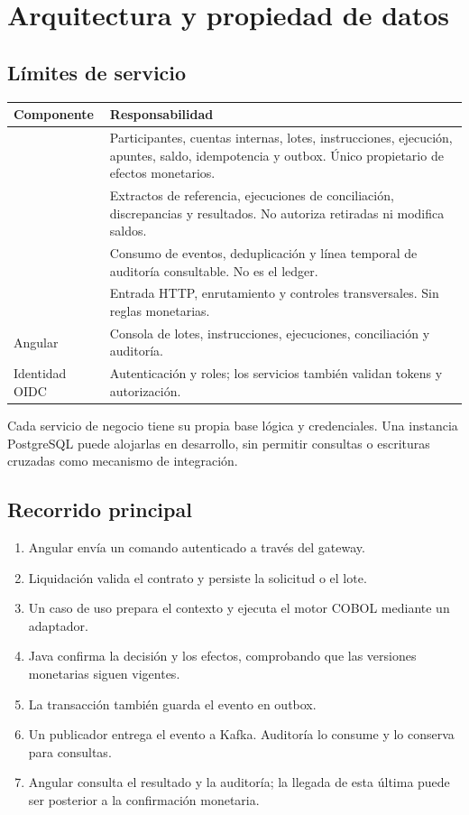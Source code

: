 \chapter{Arquitectura y propiedad de datos}
\section{Límites de servicio}
\begin{longtable}{L{0.30\textwidth}L{0.62\textwidth}}
\textbf{Componente} & \textbf{Responsabilidad}\\\hline
{} & Participantes, cuentas internas, lotes, instrucciones, ejecución, apuntes, saldo, idempotencia y outbox. Único propietario de efectos monetarios.\\
 & Extractos de referencia, ejecuciones de conciliación, discrepancias y resultados. No autoriza retiradas ni modifica saldos.\\
 & Consumo de eventos, deduplicación y línea temporal de auditoría consultable. No es el ledger.\\
 & Entrada HTTP, enrutamiento y controles transversales. Sin reglas monetarias.\\
Angular & Consola de lotes, instrucciones, ejecuciones, conciliación y auditoría.\\
Identidad OIDC & Autenticación y roles; los servicios también validan tokens y autorización.\\
\end{longtable}

Cada servicio de negocio tiene su propia base lógica y credenciales. Una instancia PostgreSQL puede alojarlas en desarrollo, sin permitir consultas o escrituras cruzadas como mecanismo de integración.

\section{Recorrido principal}
\begin{enumerate}
\item Angular envía un comando autenticado a través del gateway.
\item Liquidación valida el contrato y persiste la solicitud o el lote.
\item Un caso de uso prepara el contexto y ejecuta el motor COBOL mediante un adaptador.
\item Java confirma la decisión y los efectos, comprobando que las versiones monetarias siguen vigentes.
\item La transacción también guarda el evento en outbox.
\item Un publicador entrega el evento a Kafka. Auditoría lo consume y lo conserva para consultas.
\item Angular consulta el resultado y la auditoría; la llegada de esta última puede ser posterior a la confirmación monetaria.
\end{enumerate}

